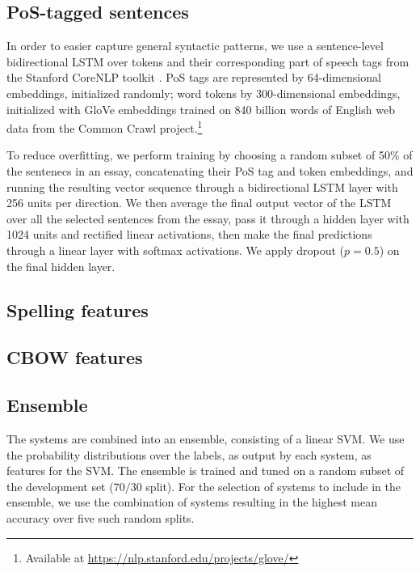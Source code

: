 \documentclass[11pt,letterpaper]{article}
\begin{document}
\subsection{PoS-tagged sentences}
In order to easier capture general syntactic patterns, we use a sentence-level
bidirectional LSTM over tokens and their corresponding part of speech tags
from the Stanford CoreNLP toolkit \citep{Manning2014corenlp}.  PoS tags are
represented by
64-dimensional embeddings, initialized randomly;  word tokens by
300-dimensional embeddings, initialized with GloVe \citep{Pennington2014glove}
embeddings trained on 840 billion words of English web data from the Common
Crawl project.\footnote{ Available at
\url{https://nlp.stanford.edu/projects/glove/}}

To reduce overfitting, we perform training by choosing a random subset of 50\%
of the sentenecs in an essay, concatenating their PoS tag and token
embeddings, and running the resulting vector sequence through a bidirectional
LSTM layer with 256 units per direction. We then average the final output
vector of the LSTM over all the selected sentences from the essay, pass it
through a hidden layer with 1024 units and rectified linear activations, then
make the final predictions through a linear layer with softmax activations.
We apply dropout ($p = 0.5$) on the final hidden layer.

\subsection{Spelling features}

\subsection{CBOW features}

\subsection{Ensemble}
The systems are combined into an ensemble, consisting of a linear SVM.
We use the probability distributions over the labels, as output by each system, as features for the SVM.
The ensemble is trained and tuned on a random subset of the development set ($70/30$ split).
For the selection of systems to include in the ensemble, we use the combination of systems resulting in the highest mean accuracy over five such random splits.
\end{document}

